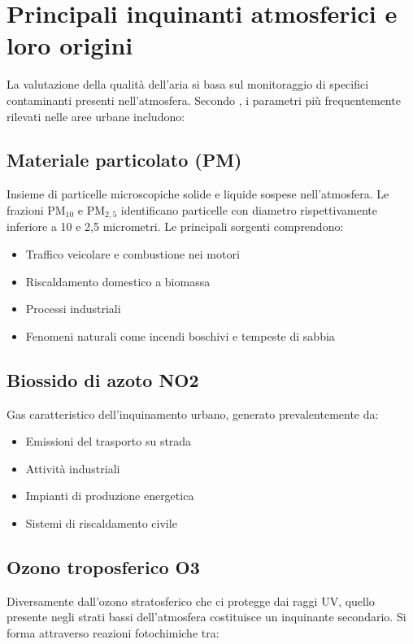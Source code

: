 \section{Principali inquinanti atmosferici e loro origini}

La valutazione della qualità dell'aria si basa sul monitoraggio di specifici contaminanti presenti nell'atmosfera.
Secondo \citet{GoogleMapsAirQuality2024}, i parametri più frequentemente rilevati nelle aree urbane includono:

\subsection{Materiale particolato (PM)}

Insieme di particelle microscopiche solide e liquide sospese nell'atmosfera.
Le frazioni PM$_{10}$ e PM$_{2,5}$ identificano particelle con diametro rispettivamente inferiore a 10 e 2,5 micrometri.
Le principali sorgenti comprendono:

\begin{itemize}
  \item Traffico veicolare e combustione nei motori
  \item Riscaldamento domestico a biomassa
  \item Processi industriali
  \item Fenomeni naturali come incendi boschivi e tempeste di sabbia
\end{itemize}

\subsection{Biossido di azoto NO2}

Gas caratteristico dell'inquinamento urbano, generato prevalentemente da:

\begin{itemize}
  \item Emissioni del trasporto su strada
  \item Attività industriali
  \item Impianti di produzione energetica
  \item Sistemi di riscaldamento civile
\end{itemize}

\subsection{Ozono troposferico O3}

Diversamente dall'ozono stratosferico che ci protegge dai raggi UV, quello presente negli strati bassi dell'atmosfera
costituisce un inquinante secondario. Si forma attraverso reazioni fotochimiche tra:

